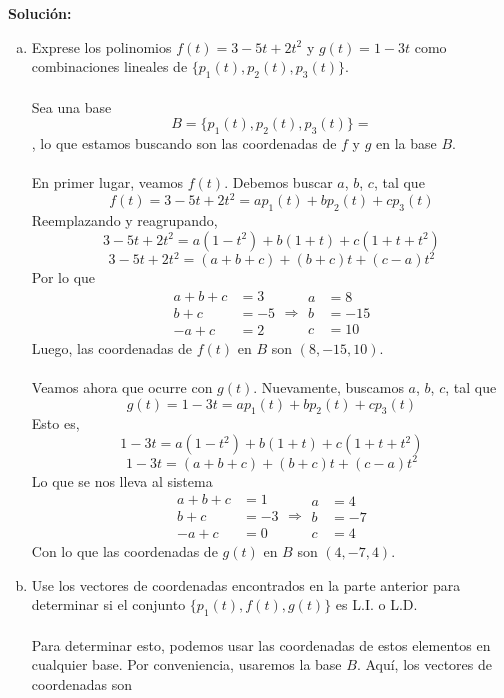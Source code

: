 \documentclass[12pt]{article}
\newenvironment{solucion}
{\begin{mdframed}[backgroundcolor=black!10]
		{\bf Solución:}\\
	}
	{
	\end{mdframed}
}
\newenvironment{preguntas}
{\begin{enumerate}\itemsep12pt
	}
	{
	\end{enumerate}
}
\begin{document}
\begin{preguntas}
\begin{solucion}
\begin{enumerate}[a)]
\item Exprese los polinomios $f(t) = 3-5t + 2t^2$ y $g(t) = 1-3t$ como combinaciones lineales de $\{p_1(t), p_2(t), p_3(t)\}$.\\
			\\
			Sea una base 
			$$B = \{p_1(t), p_2(t), p_3(t)\} = $$, lo que estamos buscando son las coordenadas de $f$ y $g$ en la base $B$.\\
			\\
			En primer lugar, veamos $f(t)$. Debemos buscar $a$, $b$, $c$, tal que
			$$f(t) = 3-5t + 2t^2 = ap_1(t) + bp_2(t) + cp_3(t)$$
			Reemplazando y reagrupando,
			$$3-5t + 2t^2 = a(1-t^2) + b(1+t) + c(1+t+t^2)$$
			$$3-5t + 2t^2 = (a+b+c) + (b+c)t + (c-a)t^2$$
			Por lo que
			$$\begin{array}{rl}
			a + b +c & = 3\\
			b + c & =-5\\
			-a+c & =2
			\end{array} \Longrightarrow
			\begin{array}{rl}
			a & = 8\\
			b & =-15\\
			c & = 10
			\end{array}$$
			Luego, las coordenadas de $f(t)$ en $B$ son $(8,-15,10)$.\\
			\\
			Veamos ahora que ocurre con $g(t)$. Nuevamente, buscamos $a$, $b$, $c$, tal que
			$$g(t) = 1-3t =  ap_1(t) + bp_2(t) + cp_3(t)$$
			Esto es,
			$$1-3t = a(1-t^2) + b(1+t) + c(1+t+t^2)$$
			$$1-3t = (a+b+c) + (b+c)t + (c-a)t^2$$
			Lo que se nos lleva al sistema
			$$\begin{array}{rl}
			a + b +c & = 1\\
			b + c & =-3\\
			-a+c & =0
			\end{array} \Longrightarrow
			\begin{array}{rl}
			a & = 4\\
			b & =-7\\
			c & = 4
			\end{array}$$
			Con lo que las coordenadas de $g(t)$ en $B$ son $(4,-7,4)$.
\item Use los vectores de coordenadas encontrados en la parte anterior para determinar si el conjunto $\{p_1(t), f(t), g(t)\}$ es L.I. o L.D.\\
			\\
			Para determinar esto, podemos usar las coordenadas de estos elementos en cualquier base. Por conveniencia, usaremos la base $B$. Aquí, los vectores de coordenadas son

\end{enumerate}
\end{solucion}
\end{preguntas}
\end{document}
